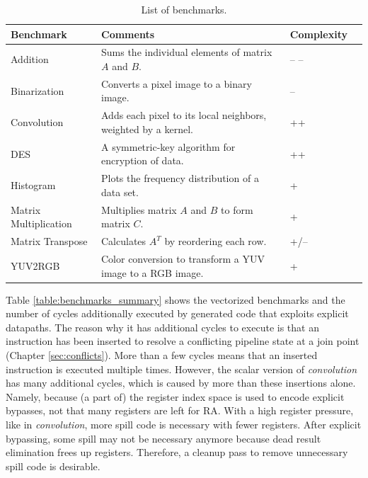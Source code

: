 \begin{table}[H]
\caption{List of benchmarks.}
\begin{center}
\begin{tabular}{@{}l l l l@{}}
\toprule
\textbf{Benchmark} 	& \textbf{Comments} & \hspace{-30px}\textbf{Complexity}	 		\\ \hline
Addition			& Sums the individual elements of matrix $A$ and $B$.	& -- --\\
Binarization		& Converts a pixel image to a binary image. 			& --\\
Convolution		& Adds each pixel to its local neighbors, weighted by a kernel. & ++\\
DES				& A symmetric-key algorithm for encryption of data. 		& ++	\\
Histogram			& Plots the frequency distribution of a data set. 			& +\\
Matrix Multiplication	& Multiplies matrix $A$ and $B$ to form matrix $C$. 		& +\\
Matrix Transpose	& Calculates $A^T$ by reordering each row.			& +/--\\
YUV2RGB		& Color conversion to transform a YUV image to a RGB image.	& +\\
\bottomrule
\end{tabular}
\end{center}
\label{table:benchmarks_overview}
\end{table}%

\newpage

Table \ref{table:benchmarks_summary} shows the vectorized benchmarks and the number of cycles additionally executed by generated code that exploits explicit datapaths. The reason why it has additional cycles to execute is that an instruction has been inserted to resolve a conflicting pipeline state at a join point (Chapter \ref{sec:conflicts}). More than a few cycles means that an inserted instruction is executed multiple times. However, the scalar version of \emph{convolution} has many additional cycles, which is caused by more than these insertions alone. Namely, because (a part of) the register index space is used to encode explicit bypasses, not that many registers are left for RA. With a high register pressure, like in \emph{convolution}, more spill code is necessary with fewer registers. After explicit bypassing, some spill may not be necessary anymore because dead result elimination frees up registers. Therefore, a cleanup pass to remove unnecessary spill code is desirable.\\

